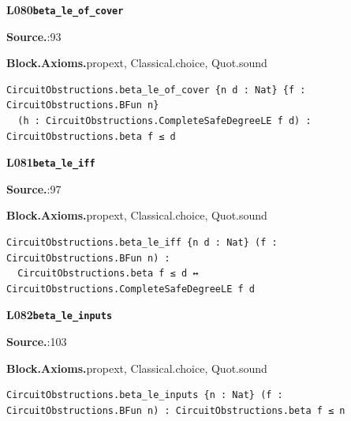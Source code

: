 \par\medskip\noindent\begin{minipage}{\textwidth}
{\small\bfseries L080\enspace\texttt{beta\_le\_of\_cover}\par}
{\footnotesize\raggedright\textbf{Source.}\enspace{}:93\par
\textbf{Block.}\quad\textbf{Axioms.}\enspace propext, Classical.choice, Quot.sound\par}\nopagebreak
\begin{lstlisting}
CircuitObstructions.beta_le_of_cover {n d : Nat} {f : CircuitObstructions.BFun n}
  (h : CircuitObstructions.CompleteSafeDegreeLE f d) : CircuitObstructions.beta f ≤ d
\end{lstlisting}
\end{minipage}\par

\par\medskip\noindent\begin{minipage}{\textwidth}
{\small\bfseries L081\enspace\texttt{beta\_le\_iff}\par}
{\footnotesize\raggedright\textbf{Source.}\enspace{}:97\par
\textbf{Block.}\quad\textbf{Axioms.}\enspace propext, Classical.choice, Quot.sound\par}\nopagebreak
\begin{lstlisting}
CircuitObstructions.beta_le_iff {n d : Nat} (f : CircuitObstructions.BFun n) :
  CircuitObstructions.beta f ≤ d ↔ CircuitObstructions.CompleteSafeDegreeLE f d
\end{lstlisting}
\end{minipage}\par

\par\medskip\noindent\begin{minipage}{\textwidth}
{\small\bfseries L082\enspace\texttt{beta\_le\_inputs}\par}
{\footnotesize\raggedright\textbf{Source.}\enspace{}:103\par
\textbf{Block.}\quad\textbf{Axioms.}\enspace propext, Classical.choice, Quot.sound\par}\nopagebreak
\begin{lstlisting}
CircuitObstructions.beta_le_inputs {n : Nat} (f : CircuitObstructions.BFun n) : CircuitObstructions.beta f ≤ n
\end{lstlisting}
\end{minipage}\par

